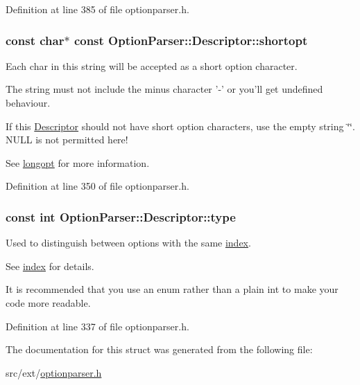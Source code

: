 Definition at line 385 of file optionparser.\-h.

\hypertarget{struct_option_parser_1_1_descriptor_a21415d74531b006e9a7a06ccadbd2721}{
\subsubsection[{shortopt}]{\setlength{\rightskip}{0pt plus 5cm}const char$\ast$ const Option\-Parser\-::\-Descriptor\-::shortopt}}\label{struct_option_parser_1_1_descriptor_a21415d74531b006e9a7a06ccadbd2721}


Each char in this string will be accepted as a short option character. 

The string must not include the minus character {\ttfamily '-\/'} or you'll get undefined behaviour.

If this \hyperlink{struct_option_parser_1_1_descriptor}{Descriptor} should not have short option characters, use the empty string \char`\"{}\char`\"{}. N\-U\-L\-L is not permitted here!

See \hyperlink{struct_option_parser_1_1_descriptor_ab9db8207bae68dd5c4ee83e05189a9d0}{longopt} for more information. 

Definition at line 350 of file optionparser.\-h.

\hypertarget{struct_option_parser_1_1_descriptor_a070d24a33fc9f30cf3deafa428ff7fa7}{
\subsubsection[{type}]{\setlength{\rightskip}{0pt plus 5cm}const int Option\-Parser\-::\-Descriptor\-::type}}\label{struct_option_parser_1_1_descriptor_a070d24a33fc9f30cf3deafa428ff7fa7}


Used to distinguish between options with the same \hyperlink{struct_option_parser_1_1_descriptor_ae62860781844b44c0bd4f730c96701d7}{index}. 

See \hyperlink{struct_option_parser_1_1_descriptor_ae62860781844b44c0bd4f730c96701d7}{index} for details.

It is recommended that you use an enum rather than a plain int to make your code more readable. 

Definition at line 337 of file optionparser.\-h.



The documentation for this struct was generated from the following file\-:\begin{DoxyCompactItemize}
\item 
src/ext/\hyperlink{optionparser_8h}{optionparser.\-h}\end{DoxyCompactItemize}
